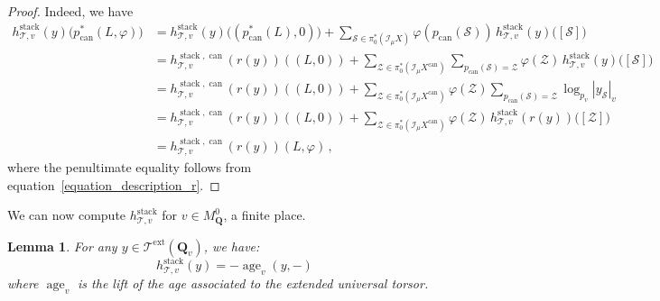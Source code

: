 \documentclass{proc-l}
\newcommand{\Q}{\mathbf{Q}}
\newcommand{\I}{\mathcal{I}}
\DeclareMathOperator{\can}{can}
\DeclareMathOperator{\stack}{stack}
\DeclareMathOperator{\age}{age}
\DeclareMathOperator{\ext}{ext}
\newcommand{\stackZ}{\mathcal{Z}}
\newcommand{\stackS}{\mathcal{S}}
\newcommand{\stackT}{\mathcal{T}}
\newcommand{\sheafI}{\mathcal{I}}
\newcommand{\twistsector}{\pi_0^*(\sheafI_{\mu} X)}
\newtheorem{lemma}[theorem]{Lemma}
\theoremstyle{definition}
\theoremstyle{remark}
\numberwithin{equation}{section}
\begin{document}
\begin{proof}
Indeed, we have
\begin{align*}
h_{\stackT,v}^{\stack}(y)\bigl(p_{\can}^*(L,\varphi)\bigr)
&=
h_{\stackT,v}^{\stack}(y)\bigl((p_{\can}^*(L),0)\bigr)
+
\sum_{\stackS \in \twistsector}
\varphi(p_{\can}(\stackS))
\, h_{\stackT,v}^{\stack}(y)\bigl([\stackS]\bigr) \\
&=
h_{\stackT,v}^{\stack,\can}\!\left(r(y)\right)((L,0))
+
\sum_{\stackZ \in \pi_0^*(\I_{\mu} X^{\can})}
\sum_{p_{\can}(\stackS)=\stackZ}
\varphi(\stackZ)
\, h_{\stackT,v}^{\stack}(y)\bigl([\stackS]\bigr) \\
&=
h_{\stackT,v}^{\stack,\can}\!\left(r(y)\right)((L,0))
+
\sum_{\stackZ \in \pi_0^*(\I_{\mu} X^{\can})}
\varphi(\stackZ)
\sum_{p_{\can}(\stackS)=\stackZ}
\log_{p_v} |y_{\stackS}|_v \\
&=
h_{\stackT,v}^{\stack,\can}\!\left(r(y)\right)((L,0))
+
\sum_{\stackZ \in \pi_0^*(\I_{\mu} X^{\can})}
\varphi(\stackZ)
\, h_{\stackT,v}^{\stack}(r(y))\bigl([\stackZ]\bigr) \\
&= h_{\stackT,v}^{\stack,\can}\!\left(r(y)\right)(L,\varphi) \, ,
\end{align*}
where the penultimate equality follows from equation~\eqref{equation_description_r}.
\end{proof}

We can now compute $h_{\stackT,v}^{\stack}$ for $v \in M_{\Q}^0$, a finite place.

\begin{lemma}\label{lemma_general_computation_naive_height_finite_place}
For any $y \in \stackT^{\ext}(\Q_v)$, we have:
$$h_{\stackT,v}^{\stack}(y) = - \age_v(y,-) $$where $\age_v$ is the lift of the age associated to the extended universal torsor. 
\end{lemma}
\end{document}

